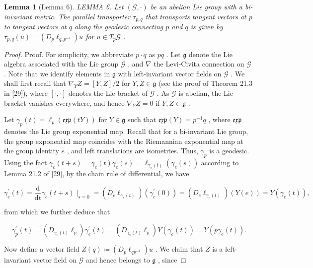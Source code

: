 \documentclass[11pt]{article}
\newtheorem{lemma}{Lemma}
\begin{document}
\begin{lemma}[Lemma 6]
LEMMA 6. Let  $(\mathcal{G},\cdot)$  be an abelian Lie group with a bi-invariant metric. The parallel transporter  $\tau_{p,q}$  that transports tangent vectors at  $p$  to tangent vectors at  $q$  along the geodesic connecting  $p$  and  $q$  is given by  $\tau_{p,q}(u) = (D_p\ell_{q,p^{-1}})u$  for  $u\in T_p\mathcal{G}$ .
\end{lemma}

\begin{proof}
Proof. For simplicity, we abbreviate  $p \cdot q$  as  $pq$ . Let  $\mathfrak{g}$  denote the Lie algebra associated with the Lie group  $\mathcal{G}$ , and  $\nabla$  the Levi-Civita connection on  $\mathcal{G}$ . Note that we identify elements in  $\mathfrak{g}$  with left-invariant vector fields on  $\mathcal{G}$ . We shall first recall that  $\nabla_{Y}Z = [Y,Z] / 2$  for  $Y,Z \in \mathfrak{g}$  (see the proof of Theorem 21.3 in [29]), where  $[\cdot ,\cdot ]$  denotes the Lie bracket of  $\mathcal{G}$ . As  $\mathcal{G}$  is abelian, the Lie bracket vanishes everywhere, and hence  $\nabla_{Y}Z = 0$  if  $Y,Z \in \mathfrak{g}$ .

Let  $\gamma_p(t) = \ell_p(\mathfrak{exp}(tY))$  for  $Y \in \mathfrak{g}$  such that  $\mathfrak{exp}(Y) = p^{-1}q$ , where  $\mathfrak{exp}$  denotes the Lie group exponential map. Recall that for a bi-invariant Lie group, the group exponential map coincides with the Riemannian exponential map at the group identity  $e$ , and left translations are isometries. Thus,  $\gamma_p$  is a geodesic. Using the fact  $\gamma_e(t + s) = \gamma_e(t)\gamma_e(s) = \ell_{\gamma_e(t)}(\gamma_e(s))$  according to Lemma 21.2 of [29], by the chain rule of differential, we have

$$
\gamma_ {e} ^ {\prime} (t) = \frac {\mathrm {d}}{\mathrm {d} t} \gamma_ {e} (t + s) \mid_ {s = 0} = (D _ {e} \ell_ {\gamma_ {e} (t)}) (\gamma_ {e} ^ {\prime} (0)) = (D _ {e} \ell_ {\gamma_ {e} (t)}) (Y (e)) = Y (\gamma_ {e} (t)),
$$

from which we further deduce that

$$
\gamma_ {p} ^ {\prime} (t) = (D _ {\gamma_ {e} (t)} \ell_ {p}) \gamma_ {e} ^ {\prime} (t) = (D _ {\gamma_ {e} (t)} \ell_ {p}) Y (\gamma_ {e} (t)) = Y (p \gamma_ {e} (t)).
$$

Now define a vector field  $Z(q) \coloneqq (D_p\ell_{qp^{-1}})u$ . We claim that  $Z$  is a left-invariant vector field on  $\mathcal{G}$  and hence belongs to  $\mathfrak{g}$ , since


\end{proof}
\end{document}
